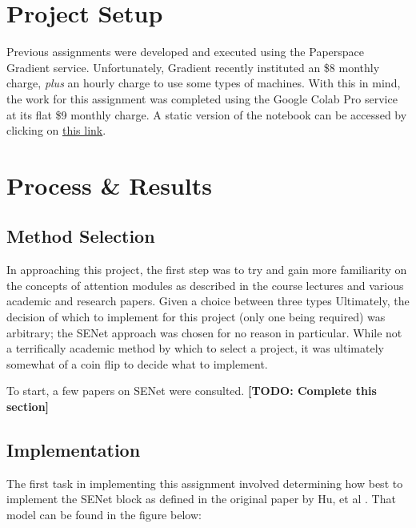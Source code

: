 \documentclass{article}
\begin{document}
  
  \graphicspath{{./images/}}

\section{Project Setup}
\par Previous assignments were developed and executed using the Paperspace Gradient service.
Unfortunately, Gradient recently instituted an \$8 monthly charge, \textit{plus} an hourly charge to use some types of machines.
With this in mind, the work for this assignment was completed using the Google Colab Pro service at its flat \$9 monthly charge.
A static version of the notebook can be accessed by clicking on \href{https://colab.research.google.com/drive/1pp5azAPubxAZP9u5DPgnywmt1fpxQWaU}{this link}.


\section{Process \& Results}
\subsection{Method Selection}
In approaching this project, the first step was to try and gain more familiarity on the concepts of attention modules as described in the course lectures and various academic and research papers.
Given a choice between three types 
Ultimately, the decision of which to implement for this project (only one being required) was arbitrary; the SENet approach was chosen for no reason in particular.
While not a terrifically academic method by which to select a project, it was ultimately somewhat of a coin flip to decide what to implement.

\par To start, a few papers on SENet were consulted. \textbf{[TODO: Complete this section]}
\subsection{Implementation} \label{impl}
\par The first task in implementing this assignment involved determining how best to implement the SENet block as defined in the original paper by Hu, et al \cite{Hu2020Squeeze-and-ExcitationNetworks}.
That model can be found in the figure below:
\end{document}
